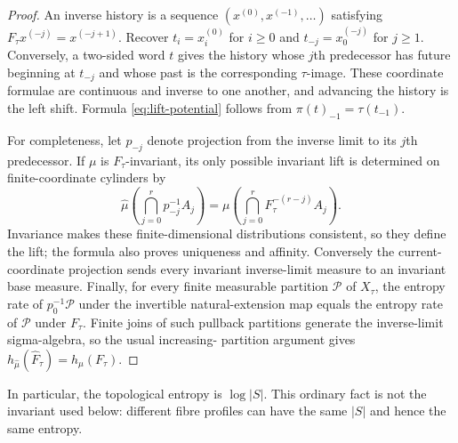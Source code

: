 \begin{proof}
An inverse history is a sequence
$(x^{(0)},x^{(-1)},\ldots)$ satisfying
$F_\tau x^{(-j)}=x^{(-j+1)}$.  Recover $t_i=x^{(0)}_i$ for $i\geq0$ and
$t_{-j}=x^{(-j)}_0$ for $j\geq1$.  Conversely, a two-sided word $t$ gives
the history whose $j$th predecessor has future beginning at $t_{-j}$ and
whose past is the corresponding $\tau$-image.  These coordinate formulae
are continuous and inverse to one another, and advancing the history is the
left shift.  Formula \eqref{eq:lift-potential} follows from
$\pi(t)_{-1}=\tau(t_{-1})$.

For completeness, let $p_{-j}$ denote projection from the inverse limit to
its $j$th predecessor.  If $\mu$ is $F_\tau$-invariant, its only possible
invariant lift is determined on finite-coordinate cylinders by
\[
 \widehat\mu\!\left(\bigcap_{j=0}^r p_{-j}^{-1}A_j\right)
 =\mu\!\left(\bigcap_{j=0}^r
       F_\tau^{-(r-j)}A_j\right).
 \tag{2.5}\label{eq:natural-measure}
\]
Invariance makes these finite-dimensional distributions consistent, so they
define the lift; the formula also proves uniqueness and affinity.  Conversely
the current-coordinate projection sends every invariant inverse-limit
measure to an invariant base measure.  Finally, for every finite measurable
partition $\mathcal P$ of $X_\tau$, the entropy rate of
$p_0^{-1}\mathcal P$ under the invertible natural-extension map equals the
entropy rate of $\mathcal P$ under $F_\tau$.  Finite joins of such pullback
partitions generate the inverse-limit sigma-algebra, so the usual increasing-
partition argument gives
$h_{\widehat\mu}(\widehat F_\tau)=h_\mu(F_\tau)$.
\end{proof}

In particular, the topological entropy is $\log|S|$.  This ordinary fact is
not the invariant used below: different fibre profiles can have the same
$|S|$ and hence the same entropy.
